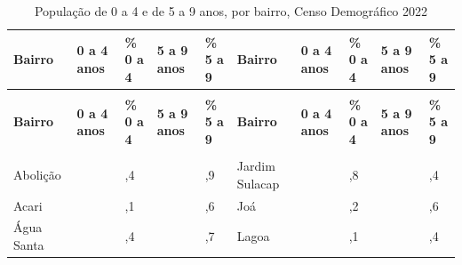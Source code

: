 \begin{apendicesenv}
{\renewcommand{\arraystretch}{1.0}
{\scriptsize\setlength{\tabcolsep}{3.5pt}
\begin{longtable}{@{}>{\raggedright\arraybackslash}p{2.65cm}>{\raggedleft\arraybackslash}p{0.95cm}>{\raggedleft\arraybackslash}p{0.95cm}>{\raggedleft\arraybackslash}p{0.95cm}>{\raggedleft\arraybackslash}p{0.95cm}@{\hspace{0.6cm}}>{\raggedright\arraybackslash}p{2.65cm}>{\raggedleft\arraybackslash}p{0.95cm}>{\raggedleft\arraybackslash}p{0.95cm}>{\raggedleft\arraybackslash}p{0.95cm}>{\raggedleft\arraybackslash}p{0.95cm}@{}}
\caption{População de 0 a 4 e de 5 a 9 anos, por bairro, Censo Demográfico 2022}\label{tab:censo-por-bairro}\\
\toprule \hyphenpenalty=10000\exhyphenpenalty=10000\textbf{Bairro} & \hyphenpenalty=10000\exhyphenpenalty=10000\textbf{0 a 4 anos} & \hyphenpenalty=10000\exhyphenpenalty=10000\textbf{\% 0 a 4} & \hyphenpenalty=10000\exhyphenpenalty=10000\textbf{5 a 9 anos} & \hyphenpenalty=10000\exhyphenpenalty=10000\textbf{\% 5 a 9} & \hyphenpenalty=10000\exhyphenpenalty=10000\textbf{Bairro} & \hyphenpenalty=10000\exhyphenpenalty=10000\textbf{0 a 4 anos} & \hyphenpenalty=10000\exhyphenpenalty=10000\textbf{\% 0 a 4} & \hyphenpenalty=10000\exhyphenpenalty=10000\textbf{5 a 9 anos} & \hyphenpenalty=10000\exhyphenpenalty=10000\textbf{\% 5 a 9} \\ \midrule \endfirsthead
\multicolumn{10}{@{}l}{\footnotesize\itshape (continuação)}\\ \toprule \hyphenpenalty=10000\exhyphenpenalty=10000\textbf{Bairro} & \hyphenpenalty=10000\exhyphenpenalty=10000\textbf{0 a 4 anos} & \hyphenpenalty=10000\exhyphenpenalty=10000\textbf{\% 0 a 4} & \hyphenpenalty=10000\exhyphenpenalty=10000\textbf{5 a 9 anos} & \hyphenpenalty=10000\exhyphenpenalty=10000\textbf{\% 5 a 9} & \hyphenpenalty=10000\exhyphenpenalty=10000\textbf{Bairro} & \hyphenpenalty=10000\exhyphenpenalty=10000\textbf{0 a 4 anos} & \hyphenpenalty=10000\exhyphenpenalty=10000\textbf{\% 0 a 4} & \hyphenpenalty=10000\exhyphenpenalty=10000\textbf{5 a 9 anos} & \hyphenpenalty=10000\exhyphenpenalty=10000\textbf{\% 5 a 9} \\ \midrule \endhead
\midrule \multicolumn{10}{r@{}}{\footnotesize\itshape (continua)}\\ \endfoot
\bottomrule \endlastfoot
Abolição & 313 & 3,4 & 363 & 3,9 & Jardim Sulacap & 696 & 4,8 & 779 & 5,4 \\
Acari & 2.112 & 7,1 & 2.834 & 9,6 & Joá & 22 & 2,2 & 35 & 3,6 \\
Água Santa & 280 & 4,4 & 364 & 5,7 & Lagoa & 772 & 4,1 & 816 & 4,4 \\

\end{longtable}}}
\end{apendicesenv}

